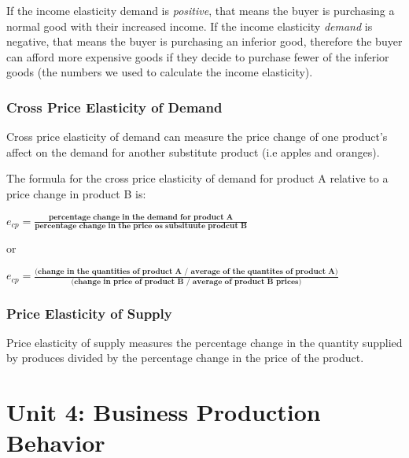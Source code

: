 \documentclass[a4paper, 12pt] {article}
\begin{document}
If the income elasticity demand is \emph{positive}, that means the buyer is
purchasing a normal good with their increased income.
If the income elasticity \emph{demand} is negative, that means the buyer is
purchasing an inferior good, therefore the buyer can afford more expensive
goods if they decide to purchase fewer of the inferior goods (the numbers we
used to calculate the income elasticity).

\subsubsection{Cross Price Elasticity of Demand}
Cross price elasticity of demand can measure the price change of one product's 
affect on the demand for another substitute product (i.e apples and oranges).

The formula for the cross price elasticity of demand for product A relative to
a price change in product B is:
\begin{description}
    \item $e_{cp} =
        \frac{\textbf{percentage change in the demand for product A}}
             {\textbf{percentage change in the price os subsituute prodcut B}}$
    \item or
    \item $e_{cp} = \frac{\textbf{(change in the quantities of product A /
                                    average of the quantites of product A)}}
                          {\textbf{(change in price of product B / 
                                    average of product B prices)}}$
\end{description}

\subsubsection{Price Elasticity of Supply}
Price elasticity of supply measures the percentage change in the quantity 
supplied by produces divided by the percentage change in the price of the
product.

\section{Unit 4: Business Production Behavior}
\end{document}
